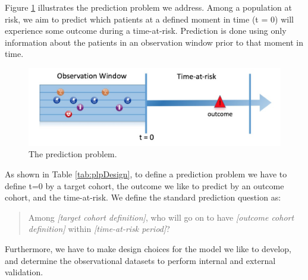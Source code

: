 \documentclass[11pt]{book}
\theoremstyle{definition}
\theoremstyle{definition}
\theoremstyle{definition}
\theoremstyle{remark}
\begin{document}
Figure \ref{fig:figure1} illustrates the prediction problem we address.
Among a population at risk, we aim to predict which patients at a
defined moment in time (t = 0) will experience some outcome during a
time-at-risk. Prediction is done using only information about the
patients in an observation window prior to that moment in time.

\begin{figure}
\includegraphics[width=1\linewidth]{images/PatientLevelPrediction/Figure1} \caption{The prediction problem.}\label{fig:figure1}
\end{figure}

As shown in Table \ref{tab:plpDesign}, to define a prediction problem we
have to define t=0 by a target cohort, the outcome we like to predict by
an outcome cohort, and the time-at-risk. We define the standard
prediction question as:  

\begin{quote}
Among \emph{{[}target cohort definition{]}}, who will go on to have
\emph{{[}outcome cohort definition{]}} within \emph{{[}time-at-risk
period{]}}?
\end{quote}

Furthermore, we have to make design choices for the model we like to
develop, and determine the observational datasets to perform internal
and external validation.
\end{document}
